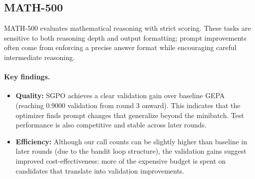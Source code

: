 \begin{table}[H]
\centering
\small
\caption{Comparison between Original GEPA and SGPO (\textit{BBH}).}
\label{tab:bbh}
\end{table}

\subsection{MATH-500}
MATH-500 evaluates mathematical reasoning with strict scoring. These tasks are sensitive to both reasoning depth and output formatting; prompt improvements often come from enforcing a precise answer format while encouraging careful intermediate reasoning.

\paragraph{Key findings.}
\begin{itemize}
    \item \textbf{Quality:} SGPO achieves a clear validation gain over baseline GEPA (reaching 0.9000 validation from round 3 onward). This indicates that the optimizer finds prompt changes that generalize beyond the minibatch. Test performance is also competitive and stable across later rounds.
    \item \textbf{Efficiency:} Although our call counts can be slightly higher than baseline in later rounds (due to the bandit loop structure), the validation gains suggest improved cost-effectiveness: more of the expensive budget is spent on candidates that translate into validation improvements.
\end{itemize}

